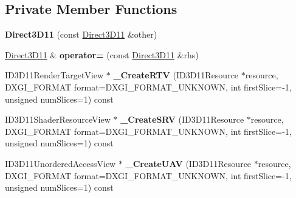 \subsection*{Private Member Functions}
\begin{DoxyCompactItemize}
\item 
{\bfseries Direct3\+D11} (const \hyperlink{class_ensum_1_1_graphics_1_1_direct3_d11}{Direct3\+D11} \&other)\hypertarget{class_ensum_1_1_graphics_1_1_direct3_d11_a7d568c79f32741212046af961492aa68}{}\label{class_ensum_1_1_graphics_1_1_direct3_d11_a7d568c79f32741212046af961492aa68}

\item 
\hyperlink{class_ensum_1_1_graphics_1_1_direct3_d11}{Direct3\+D11} \& {\bfseries operator=} (const \hyperlink{class_ensum_1_1_graphics_1_1_direct3_d11}{Direct3\+D11} \&rhs)\hypertarget{class_ensum_1_1_graphics_1_1_direct3_d11_a557bc6af306005cf46de9d5d0174aec6}{}\label{class_ensum_1_1_graphics_1_1_direct3_d11_a557bc6af306005cf46de9d5d0174aec6}

\item 
I\+D3\+D11\+Render\+Target\+View $\ast$ {\bfseries \+\_\+\+Create\+R\+TV} (I\+D3\+D11\+Resource $\ast$resource, D\+X\+G\+I\+\_\+\+F\+O\+R\+M\+AT format=D\+X\+G\+I\+\_\+\+F\+O\+R\+M\+A\+T\+\_\+\+U\+N\+K\+N\+O\+WN, int first\+Slice=-\/1, unsigned num\+Slices=1) const \hypertarget{class_ensum_1_1_graphics_1_1_direct3_d11_a360fa1814a2e6087c2ba3d0a6018fbcd}{}\label{class_ensum_1_1_graphics_1_1_direct3_d11_a360fa1814a2e6087c2ba3d0a6018fbcd}

\item 
I\+D3\+D11\+Shader\+Resource\+View $\ast$ {\bfseries \+\_\+\+Create\+S\+RV} (I\+D3\+D11\+Resource $\ast$resource, D\+X\+G\+I\+\_\+\+F\+O\+R\+M\+AT format=D\+X\+G\+I\+\_\+\+F\+O\+R\+M\+A\+T\+\_\+\+U\+N\+K\+N\+O\+WN, int first\+Slice=-\/1, unsigned num\+Slices=1) const \hypertarget{class_ensum_1_1_graphics_1_1_direct3_d11_a3b64ff06a76530eaac835d91ca78ceca}{}\label{class_ensum_1_1_graphics_1_1_direct3_d11_a3b64ff06a76530eaac835d91ca78ceca}

\item 
I\+D3\+D11\+Unordered\+Access\+View $\ast$ {\bfseries \+\_\+\+Create\+U\+AV} (I\+D3\+D11\+Resource $\ast$resource, D\+X\+G\+I\+\_\+\+F\+O\+R\+M\+AT format=D\+X\+G\+I\+\_\+\+F\+O\+R\+M\+A\+T\+\_\+\+U\+N\+K\+N\+O\+WN, int first\+Slice=-\/1, unsigned num\+Slices=1) const \hypertarget{class_ensum_1_1_graphics_1_1_direct3_d11_a52387272106b9ef4e7b9be0d0b4fcbc3}{}\label{class_ensum_1_1_graphics_1_1_direct3_d11_a52387272106b9ef4e7b9be0d0b4fcbc3}


\end{DoxyCompactItemize}
